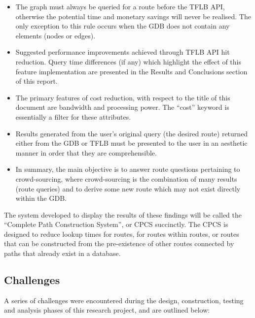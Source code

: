 \documentclass[12pt]{article}   	%
\begin{document}
\begin{itemize}
	\item The graph must always be queried for a route before the TFLB API, otherwise the potential time and monetary savings will never be realised. The only exception to this rule occurs when the GDB does not contain any elements (nodes or edges).
	\item Suggested performance improvements achieved through TFLB API hit reduction. Query time differences (if any) which highlight the effect of this feature implementation are presented in the Results and Conclusions section of this report.
	\item The primary features of cost reduction, with respect to the title of this document are bandwidth and processing power. The “cost” keyword is essentially a filter for these attributes.
	\item Results generated from the user's original query (the desired route) returned either from the GDB or TFLB must be presented to the user in an aesthetic manner in order that they are comprehensible.
	\item In summary, the main objective is to answer route questions pertaining to crowd-sourcing, where crowd-sourcing is the combination of many results (route queries) and to derive some new route which may not exist directly within the GDB.
\end{itemize}

The system developed to display the results of these findings will be called the “Complete Path Construction System”, or CPCS succinctly. The CPCS is designed to reduce lookup times for routes, for routes within routes, or routes that can be constructed from the pre-existence of other routes connected by paths that already exist in a database.

\newpage

\subsection{Challenges}
A series of challenges were encountered during the design, construction, testing and analysis phases of this research project, and are outlined below:
\end{document}

